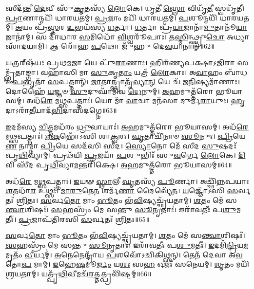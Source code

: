 𑌸𑍀𑌦᳴𑌨𑍍𑌤𑍀 \ul{𑌦𑍇}\-𑌵𑍀 𑌸𑍁᳴\-\ul{𑌕𑍃}\-𑌤𑌸𑍍𑌯᳴ \ul{𑌲𑍋}\-𑌕𑍇।
𑌧𑍃𑌤𑍀॑ \ul{𑌸𑍍𑌥𑍋} 𑌵𑌿𑌧𑍃᳴\-\ul{𑌤𑍀} 𑌸𑍍𑌵𑌧𑍃᳴𑌤𑍀।
\-\ul{𑌪𑍍𑌰𑌾}\-𑌣𑌾𑌨𑍍𑌮𑌯𑌿᳴ 𑌧𑌾𑌰𑌯𑌤𑌮𑍍।
\-\ul{𑌪𑍍𑌰}\-𑌜𑌾𑌂 𑌮𑌯𑌿᳴ 𑌧𑌾𑌰𑌯𑌤𑌮𑍍।
\-\ul{𑌪}\-𑌶𑍂𑌨𑍍𑌮𑌯𑌿᳴ 𑌧𑌾𑌰𑌯𑌤𑌮𑍍।
\-\ul{𑌅}\-𑌯𑌂 𑌪𑍍𑌰᳴\-\ul{𑌸𑍍𑌤}\-𑌰 \ul{𑌉}\-𑌭𑌯᳴𑌸𑍍𑌯 \ul{𑌧}\-𑌰𑍍𑌤𑌾।
\-\ul{𑌧}\-𑌰𑍍𑌤𑌾 𑌪𑍍𑌰᳴\-\ul{𑌯𑌾}\-𑌜𑌾𑌨𑌾᳴\-\ul{𑌮𑍁}\-𑌤𑌾𑌨𑍂᳴\-\ul{𑌯𑌾}\-𑌜𑌾𑌨𑌾॑𑌮𑍍।
𑌸 𑌦𑌾᳴𑌧𑌾𑌰 \ul{𑌸}\-𑌮𑌿𑌧𑍋᳴ \ul{𑌵𑌿}\-𑌶𑍍𑌵𑌰𑍂᳴𑌪𑌾𑌃।
𑌤\-\ul{𑌸𑍍𑌮𑌿}\-𑌨𑍍𑌥𑍍𑌸𑍍𑌰𑍁\-\ul{𑌚𑍋} 𑌅𑌧𑍍𑌯𑌾 𑌸𑌾᳴𑌦𑌯𑌾𑌮𑌿।
𑌆 𑌰𑍋᳴𑌹 \ul{𑌪}\-𑌥𑍋 𑌜𑍁᳴𑌹𑍁 𑌦𑍇\-\ul{𑌵}\-𑌯𑌾𑌨𑌾𑌨𑍍᳴॥62॥

𑌯𑌤𑍍𑌰𑌰𑍍‌\mbox{}𑌷᳴𑌯𑌃 𑌪𑍍𑌰𑌥\-\ul{𑌮}\-𑌜𑌾 𑌯𑍇 𑌪𑍁᳴\-\ul{𑌰𑌾}\-𑌣𑌾𑌃।
𑌹𑌿𑌰᳴𑌣𑍍𑌯𑌪𑌕𑍍𑌷𑌾\-𑌽\-\ul{𑌜𑌿}\-𑌰𑌾 𑌸𑌮𑍍𑌭𑍃᳴𑌤𑌾𑌙𑍍𑌗𑌾।
𑌵𑌹𑌾᳴𑌸𑌿 𑌮𑌾 \ul{𑌸𑍁}\-𑌕𑍃\-\ul{𑌤𑌾𑌂} 𑌯𑌤𑍍𑌰᳴ \ul{𑌲𑍋}\-𑌕𑌾𑌃।
𑌅\-\ul{𑌵𑌾}\-𑌹𑌂 𑌬𑌾᳴𑌧 𑌉\-\ul{𑌪}\-𑌭𑍃𑌤𑌾᳴ \ul{𑌸}\-𑌪𑌤𑍍𑌨𑌾𑌨𑍍᳴।
\-\ul{𑌜𑌾}\-𑌤𑌾𑌨𑍍𑌭𑍍𑌰𑌾𑌤𑍃᳴\-\ul{𑌵𑍍𑌯𑌾}\-\-\ul{𑌨𑍍} 𑌯𑍇 𑌚᳴ 𑌜\-\ul{𑌨𑌿}\-𑌷𑍍𑌯𑌮𑌾᳴𑌣𑌾𑌃।
𑌦𑍋𑌹𑍈᳴ \ul{𑌯}\-𑌜𑍍𑌞𑍞 \ul{𑌸𑍁}\-𑌦𑍁𑌘𑌾᳴𑌮𑌿𑌵 \ul{𑌧𑍇}\-𑌨𑍁𑌮𑍍।
\-\ul{𑌅}\-𑌹𑌮𑍁𑌤𑍍𑌤᳴𑌰𑍋 𑌭𑍂𑌯𑌾𑌸𑌮𑍍।
𑌅𑌧᳴\-\ul{𑌰𑍇} 𑌮\-\ul{𑌥𑍍𑌸}\-𑌪𑌤𑍍𑌨𑌾𑌃॑।
𑌯𑍋 𑌮𑌾᳴ \ul{𑌵𑌾}\-𑌚𑌾 𑌮𑌨᳴𑌸𑌾 𑌦𑍁𑌰𑍍𑌮\-\ul{𑌰𑌾}\-𑌯𑍁𑌃।
\-\ul{𑌹𑍃}\-𑌦𑌾\-𑌽𑌰𑌾᳴\-\ul{𑌤𑍀}\-𑌯𑌾𑌦᳴\-\ul{𑌭𑌿}\-𑌦𑌾𑌸᳴𑌦𑌗𑍍𑌨𑍇॥63॥

\-\ul{𑌇}\-𑌦𑌮᳴𑌸𑍍𑌯 \ul{𑌚𑌿}\-𑌤𑍍𑌤𑌮𑌧᳴𑌰𑌂 \ul{𑌧𑍍𑌰𑍁}\-𑌵𑌾𑌯𑌾𑌃॑।
\-\ul{𑌅}\-𑌹𑌮𑍁𑌤𑍍𑌤᳴𑌰𑍋 𑌭𑍂𑌯𑌾𑌸𑌮𑍍।
𑌅𑌧᳴\-\ul{𑌰𑍇} 𑌮\-\ul{𑌥𑍍𑌸}\-𑌪𑌤𑍍𑌨𑌾𑌃॑।
\-\ul{𑌋}\-\-\ul{𑌷}\-𑌭𑍋᳴𑌽𑌸𑌿 𑌶𑌾\-\ul{𑌕𑍍𑌵}\-𑌰𑌃।
\-\ul{𑌘𑍃}\-𑌤𑌾𑌚𑍀᳴𑌨𑌾𑍞 \ul{𑌸𑍂}\-𑌨𑍁𑌃।
\-\ul{𑌪𑍍𑌰𑌿}\-𑌯𑍇\-\ul{𑌣} 𑌨𑌾𑌮𑍍𑌨𑌾॑ \ul{𑌪𑍍𑌰𑌿}\-𑌯𑍇 𑌸𑌦᳴𑌸𑌿 𑌸𑍀𑌦।
\-\ul{𑌸𑍍𑌯𑍋}\-𑌨𑍋 𑌮𑍇᳴ 𑌸𑍀𑌦 \ul{𑌸𑍁}\-𑌷𑌦𑌃᳴ 𑌪𑍃\-\ul{𑌥𑌿}\-𑌵𑍍𑌯𑌾𑌮𑍍।
𑌪𑍍𑌰𑌥᳴𑌯𑌿 \ul{𑌪𑍍𑌰}\-𑌜𑌯𑌾᳴ \ul{𑌪}\-𑌶𑍁𑌭𑌿𑌃᳴ 𑌸𑍁\-\ul{𑌵}\-𑌰𑍍𑌗𑍇 \ul{𑌲𑍋}\-𑌕𑍇।
\-\ul{𑌦𑌿}\-𑌵𑌿 𑌸𑍀᳴𑌦 𑌪𑍃\-\ul{𑌥𑌿}\-𑌵𑍍𑌯𑌾\-\ul{𑌮}\-𑌨𑍍𑌤𑌰𑌿᳴𑌕𑍍𑌷𑍇।
\-\ul{𑌅}\-𑌹𑌮𑍁𑌤𑍍𑌤᳴𑌰𑍋 𑌭𑍂𑌯𑌾𑌸𑌮𑍍॥64॥

𑌅𑌧᳴\-\ul{𑌰𑍇} 𑌮\-\ul{𑌥𑍍𑌸}\-𑌪𑌤𑍍𑌨𑌾𑌃॑।
\-\ul{𑌇}\-𑌯𑍟 \ul{𑌸𑍍𑌥𑌾}\-𑌲𑍀 \ul{𑌘𑍃}\-𑌤𑌸𑍍𑌯᳴ \ul{𑌪𑍂}\-𑌰𑍍𑌣𑌾।
𑌅𑌚𑍍𑌛𑌿᳴𑌨𑍍𑌨𑌪𑌯𑌾𑌃 \ul{𑌶}\-𑌤𑌧𑌾᳴\-\ul{𑌰} 𑌉𑌥𑍍𑌸𑌃᳴।
\-\ul{𑌮𑌾}\-\-\ul{𑌰𑍁}\-𑌤𑍇\-\ul{𑌨} 𑌶𑌰𑍍𑌮᳴\-\ul{𑌣𑌾} 𑌦𑍈𑌵𑍍𑌯𑍇᳴𑌨।
\-\ul{𑌯}\-𑌜𑍍𑌞𑍋᳴𑌽𑌸𑌿 \ul{𑌸}\-𑌰𑍍𑌵𑌤𑌃᳴ \ul{𑌶𑍍𑌰𑌿}\-𑌤𑌃।
\-\ul{𑌸}\-𑌰𑍍𑌵\-\ul{𑌤𑍋} 𑌮𑌾𑌂 \ul{𑌭𑍂}\-𑌤𑌂 𑌭᳴\-\ul{𑌵𑌿}\-𑌷𑍍𑌯𑌚𑍍𑌛𑍍𑌰᳴𑌯𑌤𑌾𑌮𑍍।
\-\ul{𑌶}\-𑌤𑌂 𑌮𑍇᳴ 𑌸\-\ul{𑌨𑍍𑌤𑍍𑌵𑌾}\-𑌶𑌿𑌷𑌃᳴।
\-\ul{𑌸}\-𑌹𑌸𑍍𑌰𑌂᳴ 𑌮𑍇 𑌸𑌨𑍍𑌤𑍁 \ul{𑌸𑍂}\-𑌨𑍃𑌤𑌾𑌃॑।
𑌇𑌰𑌾᳴𑌵𑌤𑍀𑌃 𑌪\-\ul{𑌶𑍁}\-𑌮𑌤𑍀𑌃॑।
\-\ul{𑌪𑍍𑌰}\-𑌜𑌾𑌪᳴𑌤𑌿𑌰𑌸𑌿 \ul{𑌸}\-𑌰𑍍𑌵𑌤𑌃᳴ \ul{𑌶𑍍𑌰𑌿}\-𑌤𑌃॥65॥

\-\ul{𑌸}\-𑌰𑍍𑌵\-\ul{𑌤𑍋} 𑌮𑌾𑌂 \ul{𑌭𑍂}\-𑌤𑌂 𑌭᳴\-\ul{𑌵𑌿}\-𑌷𑍍𑌯𑌚𑍍𑌛𑍍𑌰᳴𑌯𑌤𑌾𑌮𑍍।
\-\ul{𑌶}\-𑌤𑌂 𑌮𑍇᳴ 𑌸\-\ul{𑌨𑍍𑌤𑍍𑌵𑌾}\-𑌶𑌿𑌷𑌃᳴।
\-\ul{𑌸}\-𑌹𑌸𑍍𑌰𑌂᳴ 𑌮𑍇 𑌸𑌨𑍍𑌤𑍁 \ul{𑌸𑍂}\-𑌨𑍃𑌤𑌾𑌃॑।
𑌇𑌰𑌾᳴𑌵𑌤𑍀𑌃 𑌪\-\ul{𑌶𑍁}\-𑌮𑌤𑍀𑌃॑।
\-\ul{𑌇}\-𑌦𑌮𑌿᳴\-\ul{𑌨𑍍𑌦𑍍𑌰𑌿}\-𑌯\-\ul{𑌮}\-𑌮𑍃𑌤𑌂᳴ \ul{𑌵𑍀}\-𑌰𑍍𑌯𑌮𑍍॑।
\-\ul{𑌅}\-𑌨𑍇𑌨𑍇𑌨𑍍𑌦𑍍𑌰𑌾᳴𑌯 \ul{𑌪}\-𑌶𑌵𑍋᳴\-𑌽𑌚𑌿𑌕𑌿𑌥𑍍𑌸𑌨𑍍।
𑌤𑍇𑌨᳴ 𑌦𑍇𑌵𑌾 𑌅\-\ul{𑌵}\-𑌤𑍋\-\ul{𑌪} 𑌮𑌾𑌮𑍍।
\-\ul{𑌇}\-𑌹𑍇\-\ul{𑌷}\-𑌮𑍂\-\ul{𑌰𑍍𑌜𑌂} 𑌯\-\ul{𑌶𑌃} 𑌸\-\ul{𑌹} 𑌓𑌜𑌃᳴ 𑌸𑌨𑍇𑌯𑌮𑍍।
\-\ul{𑌶𑍃}\-𑌤𑌂 𑌮𑌯𑌿᳴ 𑌶𑍍𑌰𑌯𑌤𑌾𑌮𑍍।
𑌯𑌤𑍍𑌪𑍃᳴\-\ul{𑌥𑌿}\-𑌵𑍀𑌮𑌚᳴\-\ul{𑌰}\-𑌤𑍍𑌤𑌤𑍍𑌪𑍍𑌰𑌵𑌿᳴𑌷𑍍𑌟𑌮𑍍॥66॥

